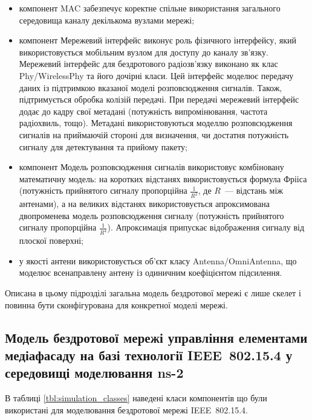 \documentclass[a4paper,ukrainian,utf8,nocolumnsxix,nocolumnxxxii,nocolumnxxxi,floatsection,equationsection]{eskdtext}
\newcommand{\iee}[0]{IEEE~802.15.4\xspace}
\begin{document}
\begin{itemize}
	\item компонент MAC забезпечує коректне спільне використання загального середовища каналу декількома вузлами мережі; 

	\item компонент Мережевий інтерфейс виконує роль фізичного інтерфейсу, який використовується мобільним вузлом для доступу до каналу зв'язку. Мережевий інтерфейс для бездротового радіозв'язку виконано як клас Phy/WirelessPhy та його дочірні класи. Цей інтерфейс моделює передачу даних із підтримкою вказаної моделі розповсюдження сигналів. Також, підтримується обробка колізій передачі. При передачі мережевий інтерфейс додає до кадру свої метадані (потужність випромінювання, частота радіохвиль, тощо). Метадані використовуються моделлю розповсюдження сигналів на приймаючій стороні для визначення, чи достатня потужність сигналу для детектування та прийому пакету;

	\item компонент Модель розповсюдження сигналів використовує комбіновану математичну модель: на коротких відстанях використовується формула Фрііса (потужність прийнятого сигналу пропорційна $\frac{1}{R^2}$, де $R$~--- відстань між антенами), а на великих відстанях використовується апроксимована двопроменева модель розповсюдження сигналу (потужність прийнятого сигналу пропорційна $\frac{1}{R^4}$). Апроксимація припускає відображення сигналу від плоскої поверхні;

	\item у якості антени використовується об'єкт класу Antenna/OmniAntenna, що моделює всенаправлену антену із одиничним коефіцієнтом підсилення. 
\end{itemize}

Описана в цьому підрозділі загальна модель бездротової мережі є лише скелет і повинна бути сконфігурована для конкретної моделі мережі.

\subsection{Модель бездротової мережі управління елементами медіафасаду на базі технології \iee у середовищі моделювання ns-2}
\label{sub:ns:ieee:network:model}

В таблиці \ref{tbl:simulation_classes} наведені класи компонентів що були використані для моделювання бездротової мережі \iee.
\end{document}
